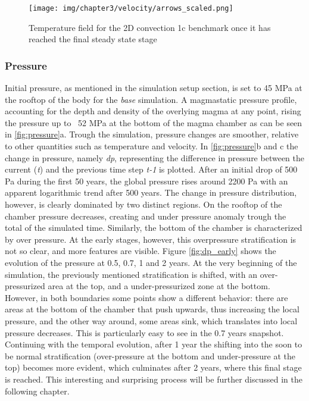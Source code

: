 \begin{figure}
	\centering
	\texttt{[image: img/chapter3/velocity/arrows\_scaled.png]}
	\caption{Temperature field for the 2D convection 1c benchmark once it has reached the final steady state stage}
	\label{fig:velocity_arrows}
\end{figure}


\subsubsection{Pressure}
Initial pressure, as mentioned in the simulation setup section, is set to 45 MPa at the rooftop of the body for the \textit{base} simulation. A magmastatic pressure profile, accounting for the depth and density of the overlying magma at any point, rising the pressure up to ~52 MPa at the bottom of the magma chamber as can be seen in \ref{fig:pressure}a. Trough the simulation, pressure changes are smoother, relative to other quantities such as temperature and velocity. In \ref{fig:pressure}b and c the change in pressure, namely \textit{dp}, representing the difference in pressure between the current (\textit{t}) and the previous time step \textit{t-1} is plotted. After an initial drop of 500 Pa during the first 50 years, the global pressure rises around 2200 Pa with an apparent logarithmic trend after 500 years.  The change in pressure distribution, however, is clearly dominated by two distinct regions. On the rooftop of the chamber pressure decreases, creating and under pressure anomaly trough the total of the simulated time. Similarly, the bottom of the chamber is characterized by over pressure. At the early stages, however, this overpressure stratification is not so clear, and more features are visible. Figure \ref{fig:dp_early} shows the evolution of the pressure at 0.5, 0.7, 1 and 2 years. At the very beginning of the simulation, the previously mentioned stratification is shifted, with an over-pressurized area at the top, and a under-pressurized zone at the bottom. However, in both boundaries some points show a different behavior: there are areas at the bottom of the chamber that push upwards, thus increasing the local pressure, and the other way around, some areas sink, which translates into local pressure decreases. This is particularly easy to see in the 0.7 years snapshot. Continuing with the temporal evolution, after 1 year the shifting into the soon to be normal stratification (over-pressure at the bottom and under-pressure at the top) becomes more evident, which culminates after 2 years, where this final stage is reached. This interesting and surprising process will be further discussed in the following chapter.
